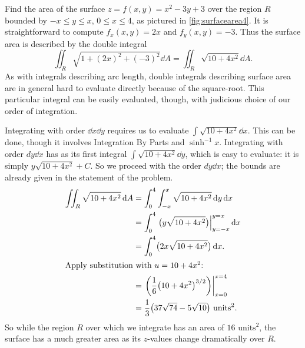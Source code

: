 \begin{example}\label{ex_surfacearea4}%
Find the area of the surface $z=f(x,y) = x^2-3y+3$ over the region $R$ bounded by $-x\leq y\leq x$, $0\leq x\leq 4$, as pictured in \autoref{fig:surfacearea4}.
\solution
It is straightforward to compute $f_x(x,y) = 2x$ and $f_y(x,y) = -3$. Thus the surface area is described by the double integral
%
%
\[\iint_R \sqrt{1+(2x)^2+(-3)^2}\dd A = \iint_R \sqrt{10+4x^2}\dd A.\]
As with integrals describing arc length, double integrals describing surface area are in general hard to evaluate directly because of the square-root. This particular integral can be easily evaluated, though, with judicious choice of our order of integration.

Integrating with order $\dd x\dd y$ requires us to evaluate $\int \sqrt{10+4x^2}\dd x$. This can be done, though it involves Integration By Parts and $\sinh^{-1}x$. Integrating with order $dy\dd x$ has as its first integral $\int \sqrt{10+4x^2}\dd y$, which is easy to evaluate: it is simply $y\sqrt{10+4x^2}+C$. So we proceed with the order $dy\dd x$; the bounds are already given in the statement of the problem.
\begin{align*}
\iint_R\sqrt{10+4x^2}\dd A &= \int_0^4\int_{-x}^x\sqrt{10+4x^2}\dd y \dd x\\
				&= \int_0^4\left.\bigl(y\sqrt{10+4x^2}\bigr)\right|_{y=-x}^{y=x}\dd x\\
				&=\int_0^4\bigl(2x\sqrt{10+4x^2}\bigr)\dd x.\\
				\intertext{Apply substitution with \intertextmath{u = 10+4x^2}:}
				&= \left.\left(\frac16\bigl(10+4x^2\bigr)^{3/2}\right)\right|_{x=0}^{x=4} \\
				&= \frac13\bigl(37\sqrt{74}-5\sqrt{10}\bigr) %
				\text{ units}^2.
\end{align*}
So while the region $R$ over which we integrate has an area of $16\text{ units}^2$, the surface has a much greater area as its $z$-values change dramatically over $R$.
\end{example}

